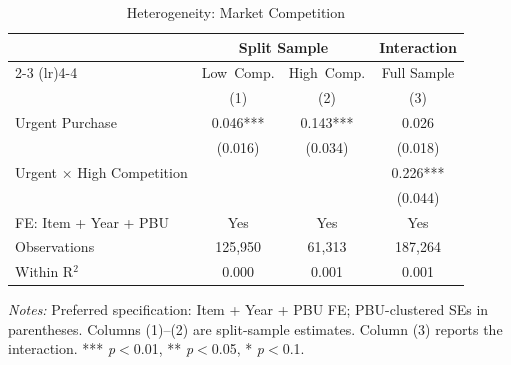 \begin{table}[ht]
  \centering
  \caption{Heterogeneity: Market Competition}
  \label{tab:het_competition}
  \small
  \begin{threeparttable}
  \begin{tabular}{lccc}
    \hline\hline
    & \multicolumn{2}{c}{Split Sample} & Interaction \\
    \cmidrule(lr){2-3} \cmidrule(lr){4-4}
    & Low~Comp. & High~Comp. & Full Sample \\
    & (1) & (2) & (3) \\
    \hline
    Urgent Purchase & 0.046*** & 0.143*** & 0.026 \\
     & (0.016) & (0.034) & (0.018) \\[3pt]
    Urgent × High Competition &  &  & 0.226*** \\
     &  &  & (0.044) \\[3pt]
    \hline
    FE: Item + Year + PBU & Yes & Yes & Yes \\
    Observations & 125,950 & 61,313 & 187,264 \\
    Within R$^2$ & 0.000 & 0.001 & 0.001 \\
    \hline\hline
  \end{tabular}
  \begin{tablenotes}
    \small
    \item \textit{Notes:} Preferred specification: Item + Year + PBU FE; PBU-clustered SEs in parentheses. Columns (1)--(2) are split-sample estimates. Column (3) reports the interaction. *** \textit{p}$<$0.01, ** \textit{p}$<$0.05, * \textit{p}$<$0.1.
  \end{tablenotes}
  \end{threeparttable}
\end{table}
